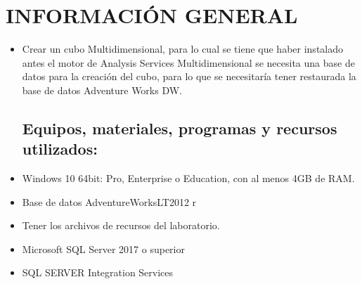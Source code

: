 \section{INFORMACIÓN GENERAL} 

\begin{itemize}
\subsection{Objetivos:}
	\item Crear un cubo Multidimensional, para lo cual se tiene que haber instalado antes el motor de Analysis
Services Multidimensional se necesita una base de datos para la creación del cubo, para lo que se necesitaría tener restaurada la base de datos Adventure Works DW.

\subsection{Equipos, materiales, programas y recursos utilizados:}
	\item Windows 10 64bit: Pro, Enterprise o Education, con al menos 4GB de RAM.
	\item Base de datos AdventureWorksLT2012 r
	\item Tener los archivos de recursos del laboratorio.
	\item Microsoft SQL Server 2017 o superior
	\item SQL SERVER Integration Services

\end{itemize}
